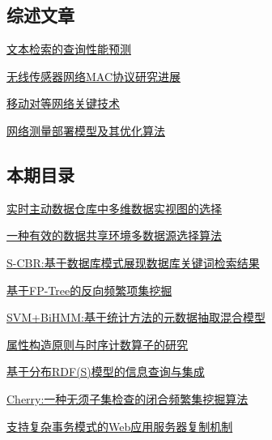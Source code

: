 \documentclass[a4paper]{article}
\begin{document}
\subsection{综述文章}
\href{http://www.jos.org.cn/ch/reader/download_pdf.aspx?file_no=20080211&year_id=2008&quarter_id=2&falg=1}{文本检索的查询性能预测}

\href{http://www.jos.org.cn/ch/reader/download_pdf.aspx?file_no=20080220&year_id=2008&quarter_id=2&falg=1}{无线传感器网络MAC协议研究进展}

\href{http://www.jos.org.cn/ch/reader/download_pdf.aspx?file_no=20080221&year_id=2008&quarter_id=2&falg=1}{移动对等网络关键技术}

\href{http://www.jos.org.cn/ch/reader/download_pdf.aspx?file_no=20080222&year_id=2008&quarter_id=2&falg=1}{网络测量部署模型及其优化算法}

\subsection{本期目录}
\href{http://www.jos.org.cn/ch/reader/download_pdf.aspx?file_no=20080212&year_id=2008&quarter_id=2&falg=1}{实时主动数据仓库中多维数据实视图的选择}

\href{http://www.jos.org.cn/ch/reader/download_pdf.aspx?file_no=20080213&year_id=2008&quarter_id=2&falg=1}{一种有效的数据共享环境多数据源选择算法}

\href{http://www.jos.org.cn/ch/reader/download_pdf.aspx?file_no=20080214&year_id=2008&quarter_id=2&falg=1}{S-CBR:基于数据库模式展现数据库关键词检索结果}

\href{http://www.jos.org.cn/ch/reader/download_pdf.aspx?file_no=20080215&year_id=2008&quarter_id=2&falg=1}{基于FP-Tree的反向频繁项集挖掘}

\href{http://www.jos.org.cn/ch/reader/download_pdf.aspx?file_no=20080217&year_id=2008&quarter_id=2&falg=1}{SVM+BiHMM:基于统计方法的元数据抽取混合模型}

\href{http://www.jos.org.cn/ch/reader/download_pdf.aspx?file_no=20080216&year_id=2008&quarter_id=2&falg=1}{属性构造原则与时序计数算子的研究}

\href{http://www.jos.org.cn/ch/reader/download_pdf.aspx?file_no=20080218&year_id=2008&quarter_id=2&falg=1}{基于分布RDF(S)模型的信息查询与集成}

\href{http://www.jos.org.cn/ch/reader/download_pdf.aspx?file_no=20080219&year_id=2008&quarter_id=2&falg=1}{Cherry:一种无须子集检查的闭合频繁集挖掘算法}

\href{http://www.jos.org.cn/ch/reader/download_pdf.aspx?file_no=20080223&year_id=2008&quarter_id=2&falg=1}{支持复杂事务模式的Web应用服务器复制机制}
\end{document}
